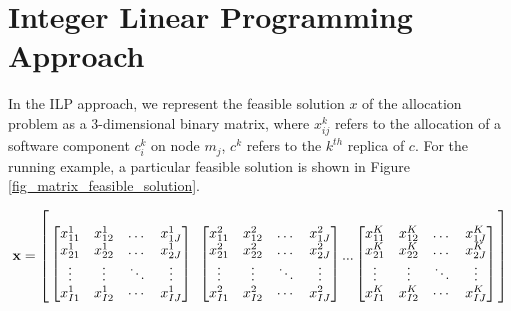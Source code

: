 \section{Integer Linear Programming Approach}
In the ILP approach, we represent the feasible solution $x$ of the allocation problem as a 3-dimensional binary matrix, where $x^k_{ij}$ refers to the allocation of a software component $c^k_i$ on node $m_j$, $c^k$ refers to the $k^{th}$ replica of $c$. For the running example, a particular feasible solution is shown in Figure \ref{fig_matrix_feasible_solution}.


\begin{center}


\begin{equation*}
\textbf{$\textbf{x}$}=
\begin{bmatrix} 

\begin{minipage}{.3\textwidth}
\centering
\[
\begin{bmatrix} 
x_{11}^1 & x_{12}^1 & \dots & x_{1J}^1\\
x_{21}^1 & x_{22}^1 & \dots & x_{2J}^1\\
\vdots & \vdots & \ddots & \vdots\\
x_{I1}^1 & x_{I2}^1 & \cdots & x_{IJ}^1
\end{bmatrix}
\]
\end{minipage}~
\begin{minipage}{0.3\textwidth}
\centering
\[
\begin{bmatrix} 
x_{11}^2 & x_{12}^2 & \dots & x_{1J}^2\\
x_{21}^2 & x_{22}^2 & \dots & x_{2J}^2\\
\vdots & \vdots & \ddots & \vdots\\
x_{I1}^2 & x_{I2}^2 & \cdots & x_{IJ}^2
\end{bmatrix}
\]
\end{minipage}
...
\begin{minipage}{0.3\textwidth}
\centering
\[
\begin{bmatrix} 
x_{11}^K & x_{12}^K & \dots & x_{1J}^K\\
x_{21}^K & x_{22}^K & \dots & x_{2J}^K\\
\vdots & \vdots & \ddots & \vdots\\
x_{I1}^K & x_{I2}^K & \cdots & x_{IJ}^K
\end{bmatrix}
\]
\end{minipage}

\end{bmatrix}
\end{equation*}

\label{fig_matrix_feasible_solution}
\end{center}
